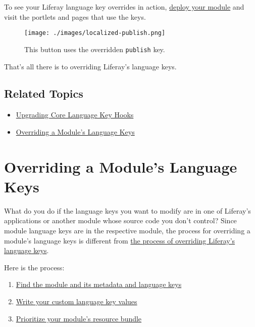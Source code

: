 To see your Liferay language key overrides in action,
\href{/docs/7-2/reference/-/knowledge_base/r/deploying-a-project}{deploy
your module} and visit the portlets and pages that use the keys.

\begin{figure}
\centering
\texttt{[image: ./images/localized-publish.png]}
\caption{This button uses the overridden \texttt{publish} key.}
\end{figure}

That's all there is to overriding Liferay's language keys.

\section{Related Topics}\label{related-topics-25}

\begin{itemize}
\tightlist
\item
  \href{/docs/7-2/tutorials/-/knowledge_base/t/upgrading-core-language-key-hooks}{Upgrading
  Core Language Key Hooks}
\item
  \href{/docs/7-2/customization/-/knowledge_base/c/overriding-a-modules-language-keys}{Overriding
  a Module's Language Keys}
\end{itemize}

\chapter{Overriding a Module's Language
Keys}\label{overriding-a-modules-language-keys}

What do you do if the language keys you want to modify are in one of
Liferay's applications or another module whose source code you don't
control? Since module language keys are in the respective module, the
process for overriding a module's language keys is different from
\href{/docs/7-2/customization/-/knowledge_base/c/overriding-global-language-keys}{the
process of overriding Liferay's language keys}.

Here is the process:

\begin{enumerate}
\def\labelenumi{\arabic{enumi}.}
\tightlist
\item
  \hyperref[find-the-module-and-its-metadata-and-language-keys]{Find the
  module and its metadata and language keys}
\item
  \hyperref[write-custom-language-key-values]{Write your custom language
  key values}
\item
  \hyperref[prioritize-your-modules-resource-bundle]{Prioritize your
  module's resource bundle}
\end{enumerate}

